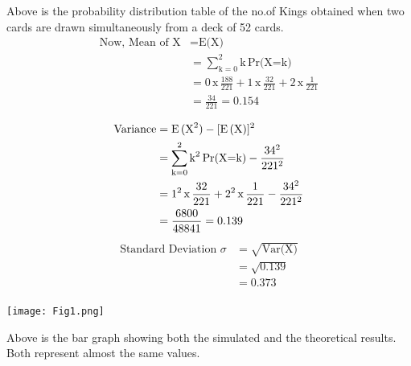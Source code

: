 \documentclass[journal,12pt,twocolumn]{IEEEtran}
\begin{document}
Above is the probability distribution table of the no.of Kings obtained when two cards are drawn simultaneously from a deck of 52 cards.
\begin{align*}
\text{Now, Mean of X}&= \text{E(X)} \\
               &=\sum_{\text{k}=0}^{2} \text{k}\,\text{Pr(X=k)}\\
               &= 0\,\text{x}\,\frac{188}{221} + 1\,\text{x}\,\frac{32}{221} + 2\,\text{x}\,\frac{1}{221}\\
               &= \frac{34}{221} = 0.154\\
\end{align*}
\vspace*{-1.5cm}
\begin{align*}
  \text{Variance} &= \text{E}\,(\text{X}^2) - [\text{E\,(X)}]^2\\
                  &= \sum_{\text{k}=0}^{2} \text{k}^2\,\text{Pr(X=k)} - \frac{34^2}{221^2}\\
                  &= 1^2\,\text{x}\,\frac{32}{221} + 2^2\,\text{x}\,\frac{1}{221} - \frac{34^2}{221^2}\\\vspace{0.1cm}
                  &= \frac{6800}{48841} = 0.139\\
\end{align*}
\vspace*{-1.5cm}
\begin{align*}
\text{Standard Deviation }\sigma &= \sqrt{\text{Var(X)}}\\ 
&= \sqrt{0.139}\\ &= 0.373\\
\end{align*}

\newpage

\texttt{[image: Fig1.png]}

 Above is the bar graph showing both the simulated and the theoretical results. Both represent almost the same values. 
\end{document}
